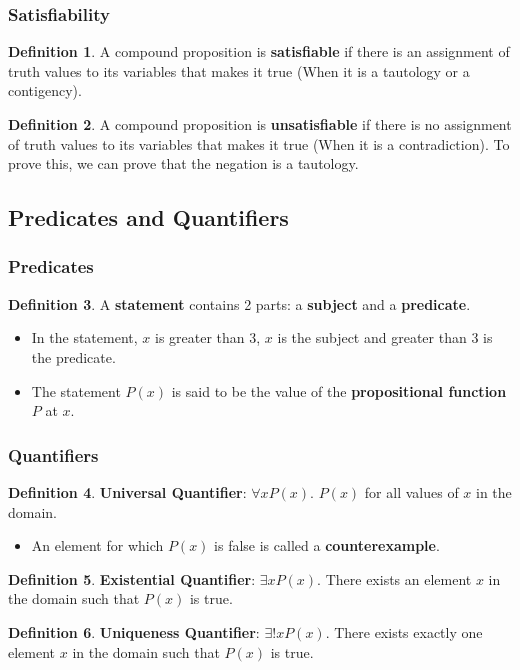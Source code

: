 \documentclass[article, 11pt]{article}
\theoremstyle{definition}
\newtheorem{definition}{Definition}[subsubsection]
\begin{document}
    \subsubsection{Satisfiability}
    \begin{definition}
        A compound proposition is \textbf{satisfiable} if there is an assignment of truth values to its variables that makes it true (When it is a tautology or a contigency). 
    \end{definition}
    \begin{definition}
        A compound proposition is \textbf{unsatisfiable} if there is no assignment of truth values to its variables that makes it true (When it is a contradiction). To prove this, we can prove that the negation is a tautology.
    \end{definition}
    \subsection{Predicates and Quantifiers}
    \subsubsection{Predicates}
    \begin{definition}
        A \textbf{statement} contains 2 parts: a \textbf{subject} and a \textbf{predicate}.
        \begin{itemize}
            \item In the statement, $x$ is greater than 3, $x$ is the subject and greater than 3 is the predicate.
            \item The statement $P(x)$ is said to be the value of the \textbf{propositional function} $P$ at $x$.
        \end{itemize}
    \end{definition}
    \subsubsection{Quantifiers}
    \begin{definition}
        \textbf{Universal Quantifier}: $\forall x P(x)$. $P(x)$ for all values of $x$ in the domain.
        \begin{itemize}
            \item An element for which $P(x)$ is false is called a \textbf{counterexample}.
        \end{itemize}   
    \end{definition}
    \begin{definition}
        \textbf{Existential Quantifier}: $\exists x P(x)$. There exists an element $x$ in the domain such that $P(x)$ is true.    
    \end{definition}
    \begin{definition}
        \textbf{Uniqueness Quantifier}: $\exists! x P(x)$. There exists exactly one element $x$ in the domain such that $P(x)$ is true.    
    \end{definition}
    
\end{document}
